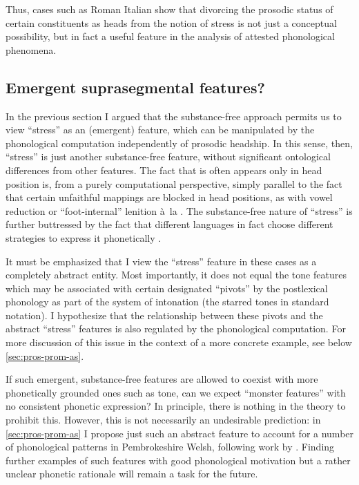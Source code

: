 Thus, cases such as Roman Italian show that divorcing the prosodic status of certain constituents as heads from the notion of stress is not just a conceptual possibility, but in fact a useful feature in the analysis of attested phonological phenomena.

\subsection{Emergent suprasegmental features?}
\label{sec:emerg-supr-feat}

In the previous section I argued that the substance\hyp free approach permits us to view \enquote{stress} as an (emergent) feature, which can be manipulated by the phonological computation independently of prosodic headship. In this sense, then, \enquote{stress} is just another substance\hyp free feature, without significant ontological differences from other features. The fact that is often appears only in head position is, from a purely computational perspective, simply parallel to the fact that certain unfaithful mappings are blocked in head positions, as with vowel reduction or \enquote{foot\hyp internal} lenition à~la \citet{harris97:_licen_inher}. The substance\hyp free nature of \enquote{stress} is further buttressed by the fact that different languages in fact choose different strategies to express it phonetically \citep[\egm][]{hulst99:_word}.

It must be emphasized that I view the \enquote{stress} feature in these cases as a completely abstract entity. Most importantly, it does not equal the tone features which may be associated with certain designated \enquote{pivots} by the postlexical phonology as part of the system of intonation (the starred tones in standard notation). I hypothesize that the relationship between these pivots and the abstract \enquote{stress} features is also regulated by the phonological computation. For more discussion of this issue in the context of a more concrete example, see below \cref{sec:pros-prom-as}.

If such emergent, substance\hyp free features are allowed to coexist with more phonetically grounded ones such as tone, can we expect \enquote{monster features} with no consistent phonetic expression? In principle, there is nothing in the theory to prohibit this. However, this is not necessarily an undesirable prediction: in \cref{sec:pros-prom-as} I propose just such an abstract feature to account for a number of phonological patterns in Pembrokeshire Welsh, following work by \citet{bosch96:_promin}. Finding further examples of such features with good phonological motivation but a rather unclear phonetic rationale will remain a task for the future.

